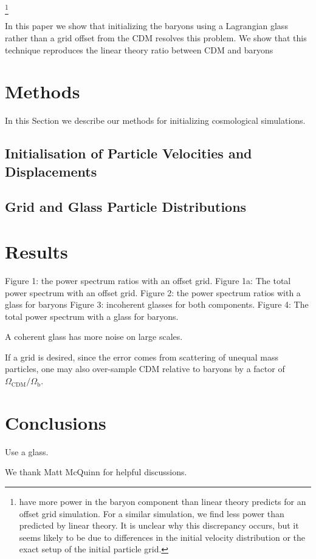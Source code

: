 \documentclass[a4paper,11pt]{article}
\begin{document}
\footnote{\cite{Angulo:2013} have more power in the baryon component than linear theory predicts for an offset grid simulation. For a similar simulation, we find less power than predicted by linear theory. It is unclear why this discrepancy occurs, but it seems likely to be due to differences in the initial velocity distribution or the exact setup of the initial particle grid.}

In this paper we show that initializing the baryons using a Lagrangian glass rather than a grid offset from the CDM resolves this problem. We show that this technique reproduces the linear theory ratio between CDM and baryons


\section{Methods}

In this Section we describe our methods for initializing cosmological simulations.

\subsection{Initialisation of Particle Velocities and Displacements}

\subsection{Grid and Glass Particle Distributions}

\section{Results}

Figure 1: the power spectrum ratios with an offset grid.
Figure 1a: The total power spectrum with an offset grid.
Figure 2: the power spectrum ratios with a glass for baryons
Figure 3: incoherent glasses for both components.
Figure 4: The total power spectrum with a glass for baryons.

A coherent glass has more noise on large scales.

If a grid is desired, since the error comes from scattering of unequal mass particles, one may also over-sample CDM relative to baryons by a factor of $\Omega_\mathrm{CDM}/\Omega_\mathrm{b}$.

\section{Conclusions}

Use a glass.

\acknowledgments

We thank Matt McQuinn for helpful discussions.



\end{document}

